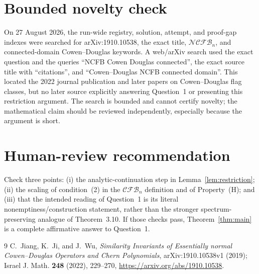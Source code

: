\documentclass[11pt]{article}
\newcommand{\NCFB}{\mathcal{NCFB}}
\newcommand{\CFB}{\mathcal{CFB}}
\begin{document}
\section{Bounded novelty check}

On 27 August 2026, the run-wide registry, solution, attempt, and proof-gap
indexes were searched for arXiv:1910.10538, the exact title, $\NCFB_n$, and
connected-domain Cowen--Douglas keywords.  A web/arXiv search used the exact
question and the queries ``NCFB Cowen Douglas connected'', the exact source
title with ``citations'', and ``Cowen--Douglas NCFB connected domain''.  This
located the 2022 journal publication and later papers on Cowen--Douglas flag
classes, but no later source explicitly answering Question~1 or presenting
this restriction argument.  The search is bounded and cannot certify novelty;
the mathematical claim should be reviewed independently, especially because
the argument is short.

\section{Human-review recommendation}

Check three points: (i) the analytic-continuation step in
Lemma~\ref{lem:restriction}; (ii) the scaling of condition~(2) in the
$\CFB_n$ definition and of Property~(H); and (iii) that the intended reading
of Question~1 is its literal nonemptiness/construction statement, rather than
the stronger spectrum-preserving analogue of Theorem~3.10.  If those checks
pass, Theorem~\ref{thm:main} is a complete affirmative answer to Question~1.

\begin{thebibliography}{9}
C.~Jiang, K.~Ji, and J.~Wu,
\emph{Similarity Invariants of Essentially normal Cowen--Douglas Operators
and Chern Polynomials}, arXiv:1910.10538v1 (2019); Israel J. Math.
\textbf{248} (2022), 229--270,
\url{https://arxiv.org/abs/1910.10538}.
\end{thebibliography}
\end{document}
